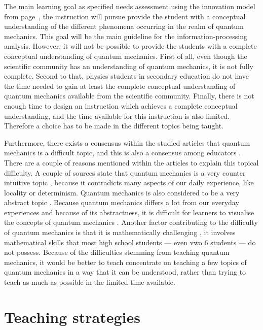 \documentclass[11pt,twoside]{report} %
\begin{document}
The main learning goal as specified needs assessment using the innovation model from page~\pageref{ssch:needsassessmentinnovation}, the instruction will pursue provide the student with a conceptual understanding of the different phenomena occurring in the realm of quantum mechanics. This goal will be the main guideline for the information-processing analysis. However, it will not be possible to provide the students with a complete conceptual understanding of quantum mechanics. First of all, even though the scientific community has an understanding of quantum mechanics, it is not fully complete. Second to that, physics students in secondary education do not have the time needed to gain at least the complete conceptual understanding of quantum mechanics available from the scientific community. Finally, there is not enough time to design an instruction which achieves a complete conceptual understanding, and the time available for this instruction is also limited. Therefore a choice has to be made in the different topics being taught.

Furthermore, there exists a consensus within the studied articles that quantum mechanics is a difficult topic, and this is also a consensus among educators \cite{gianino,papaphotis1,papaphotis2}. There are a couple of reasons mentioned within the articles to explain this topical difficulty. A couple of sources state that quantum mechanics is a very counter intuitive topic \cite{henriksen, levrini, mckagan, singh2}, because it contradicts many aspects of our daily experience, like locality or determinism. Quantum mechanics is also considered to be a very abstract topic \cite{barnes, gianino, mckagan, papaphotis1, singh1}. Because quantum mechanics differs a lot from our everyday experiences and because of its abstractness, it is difficult for learners to visualise the concepts of quantum mechanics \cite{henriksen, mckagan}. Another factor contributing to the difficulty of quantum mechanics is that it is mathematically challenging \cite{gianino, mckagan}, it involves mathematical skills that most high school students --- even vwo 6 students --- do not possess. Because of the difficulties stemming from teaching quantum mechanics, it would be better to teach concentrate on teaching a few topics of quantum mechanics in a way that it can be understood, rather than trying to teach as much as possible in the limited time available.

\section{Teaching strategies}
\end{document}
